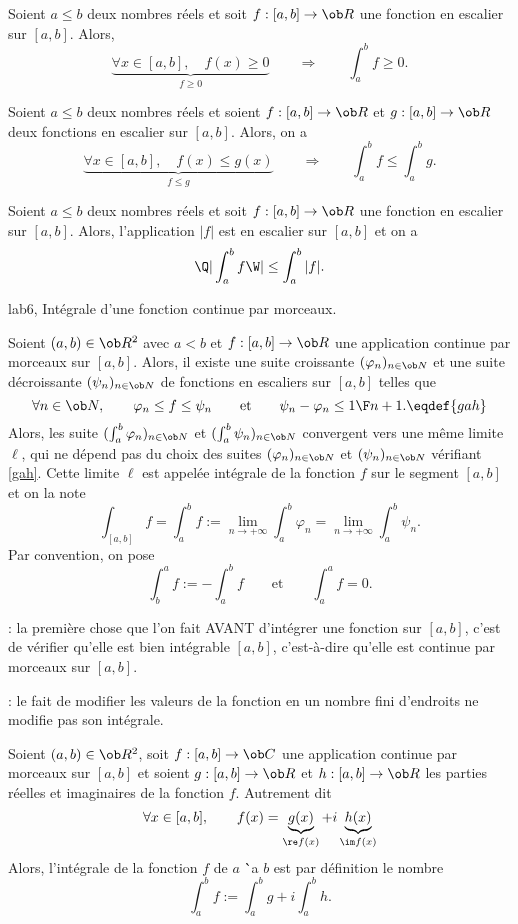 \Propriete[Title=positivit\'e de l'int\'egrale] Soient $a\le b$ deux nombres r\'eels et soit $f:[a,b]\to\ob R$ une fonction en escalier sur $[a,b]$. Alors, 
$$
\underbrace{
\forall x\in[a,b],\quad f(x)\ge0}_{f\ge0}\qquad\Longrightarrow\qquad \int_a^bf\ge0.
$$ 
\bigskip


\Propriete [Title=Croissance de l'int\'egrale]
Soient $a\le b$ deux nombres r\'eels et soient $f:[a,b]\to\ob R$ et $g:[a,b]\to\ob R$ deux fonctions en escalier sur $[a,b]$. Alors, on a 
$$
\underbrace{
\forall x\in[a,b],\quad f(x)\le g(x)}_{f\le g}\qquad\Longrightarrow\qquad \int_a^bf\le \int_a^bg.
$$ 

\Propriete[Title=module]
Soient $a\le b$ deux nombres r\'eels et soit $f:[a,b]\to\ob R$ une fonction 
en escalier sur $[a,b]$. Alors, l'application $|f|$ est en escalier sur $[a,b]$ et on a 
$$
\Q|\int_a^bf\W|\le \int_a^b|f|.
$$ 
\bigskip

\Subsection lab6, Int\'egrale d'une fonction continue par morceaux. 

\Definition []  Soient $(a,b)\in\ob R^2$ avec $a< b$ et $f:[a,b]\to\ob R$ une application continue par morceaux sur $[a,b]$. 
Alors, il existe une suite croissante $(\varphi_n)_{n\in\ob N}$ et une suite d\'ecroissante $(\psi_n)_{n\in\ob N}$ de fonctions en escaliers sur $[a,b]$ telles que 
$$
\forall n\in\ob N, \qquad \varphi_n\le f\le \psi_n\qquad\mbox{et}\qquad \psi_n-\varphi_n\le {1\F n+1}.\eqdef{gah}
$$
Alors, les suite $(\int_a^b\varphi_n)_{n\in\ob N}$ et $(\int_a^b\psi_n)_{n\in\ob N}$ convergent vers une m\^eme limite $\ell$, qui ne d\'epend pas du choix des suites $(\varphi_n)_{n\in\ob N}$ et $(\psi_n)_{n\in\ob N}$ v\'erifiant \eqref{gah}. 
Cette limite $\ell$ est appel\'ee int\'egrale de la fonction $f$ sur le segment $[a,b]$ et on la note
$$
\int_{[a,b]}f= \int_a^bf:=\lim_{n\to+\infty}\int_a^b\varphi_n=\lim_{n\to+\infty}\int_a^b\psi_n.
$$
Par convention, on pose 
$$
\int_b^af:=-\int_a^bf\qquad \mbox{et}\qquad \int_a^af=0.
$$

\Remarque: la premi\`ere chose que l'on fait AVANT d'int\'egrer une fonction sur $[a,b]$, c'est de v\'erifier qu'elle est bien int\'egrable $[a,b]$, c'est-\`a-dire qu'elle est continue par morceaux sur $[a,b]$. 
\bigskip

\Remarque : le fait de modifier les valeurs de la fonction en un nombre fini d'endroits ne modifie pas son int\'egrale. 
\bigskip

\Definition []  Soient $(a,b)\in\ob R^2$, soit $f:[a,b]\to\ob C$ une application continue par morceaux sur $[a,b]$ et soient $g:[a,b]\to\ob R$ et $h:[a,b]\to\ob R$ les parties r\'eelles et imaginaires de la fonction $f$. Autrement dit 
$$
\forall x\in[a,b], \qquad f(x)=\underbrace{g(x)}_{\re f(x)}+i\underbrace{h(x)}_{\im f(x)}
$$
Alors, l'int\'egrale de la fonction $f$ de $a$ \``a $b$ est par d\'efinition le nombre 
$$
\int_a^bf:=\int_a^bg+i\int_a^bh.
$$

